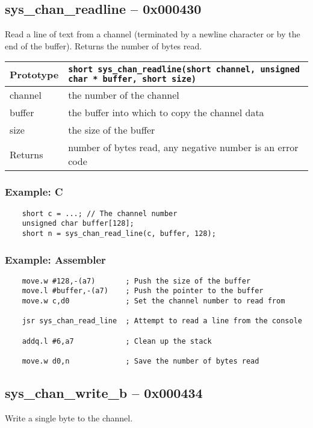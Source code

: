 \subsection*{sys\_chan\_readline -- 0x000430}
Read a line of text from a channel (terminated by a newline character or by the end of the buffer). Returns the number of bytes read.

\bigskip

\begin{tabular}{|l||l|} \hline
Prototype & \lstinline!short sys_chan_readline(short channel, unsigned char * buffer, short size)! \\ \hline
channel & the number of the channel \\ \hline
buffer & the buffer into which to copy the channel data \\ \hline
size & the size of the buffer \\ \hline
Returns & number of bytes read, any negative number is an error code \\ \hline
\end{tabular}

\subsubsection*{Example: C}
\begin{lstlisting}
    short c = ...; // The channel number
    unsigned char buffer[128];
    short n = sys_chan_read_line(c, buffer, 128);    
\end{lstlisting}

\subsubsection*{Example: Assembler}
\begin{verbatim}
    move.w #128,-(a7)       ; Push the size of the buffer
    move.l #buffer,-(a7)    ; Push the pointer to the buffer
    move.w c,d0             ; Set the channel number to read from

    jsr sys_chan_read_line  ; Attempt to read a line from the console

    addq.l #6,a7            ; Clean up the stack

    move.w d0,n             ; Save the number of bytes read
\end{verbatim}

\subsection*{sys\_chan\_write\_b -- 0x000434}
Write a single byte to the channel.

